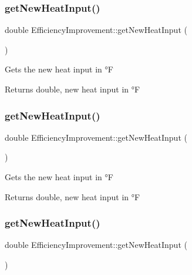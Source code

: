 \subsubsection{\texorpdfstring{get\+New\+Heat\+Input()}{getNewHeatInput()}\hspace{0.1cm}{\footnotesize\ttfamily [1/3]}}
{\footnotesize\ttfamily double Efficiency\+Improvement\+::get\+New\+Heat\+Input (\begin{DoxyParamCaption}{ }\end{DoxyParamCaption})}

Gets the new heat input in °F

\begin{DoxyReturn}{Returns}
double, new heat input in °F 
\end{DoxyReturn}
\mbox{\label{class_efficiency_improvement_a89e8480c7d2477ee249e847d4669ee2e}} 
\subsubsection{\texorpdfstring{get\+New\+Heat\+Input()}{getNewHeatInput()}\hspace{0.1cm}{\footnotesize\ttfamily [2/3]}}
{\footnotesize\ttfamily double Efficiency\+Improvement\+::get\+New\+Heat\+Input (\begin{DoxyParamCaption}{ }\end{DoxyParamCaption})}

Gets the new heat input in °F

\begin{DoxyReturn}{Returns}
double, new heat input in °F 
\end{DoxyReturn}
\mbox{\label{class_efficiency_improvement_a89e8480c7d2477ee249e847d4669ee2e}} 
\subsubsection{\texorpdfstring{get\+New\+Heat\+Input()}{getNewHeatInput()}\hspace{0.1cm}{\footnotesize\ttfamily [3/3]}}
{\footnotesize\ttfamily double Efficiency\+Improvement\+::get\+New\+Heat\+Input (\begin{DoxyParamCaption}{ }\end{DoxyParamCaption})}


